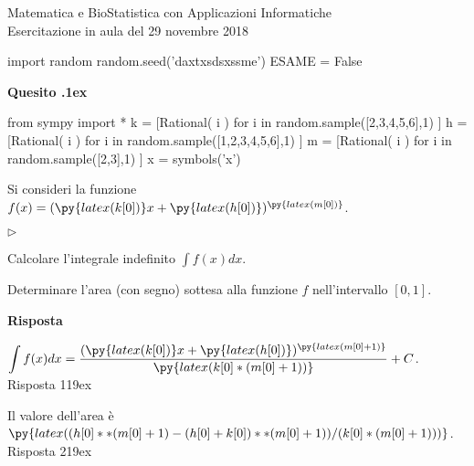 \documentclass[11pt,twoside,a4paper]{article}
\newcommand{\mylabel}[1]{#1\hfill}
\renewenvironment{itemize}
  {\begin{list}{$\triangleright$}{%
   \setlength{\parskip}{0mm}
   \setlength{\topsep}{.4\baselineskip}
   \setlength{\rightmargin}{0mm}
   \setlength{\listparindent}{0mm}
   \setlength{\itemindent}{0mm}
   \setlength{\labelwidth}{2ex}
   \setlength{\itemsep}{.4\baselineskip}
   \setlength{\parsep}{0mm}
   \setlength{\partopsep}{0mm}
   \setlength{\labelsep}{1ex}
   \setlength{\leftmargin}{\labelwidth+\labelsep}
   \let\makelabel\mylabel}}{%
   \end{list}\vspace*{-1.3mm}}
\newcounter{quesito}
\newenvironment{question}{\addtocounter{quesito}{1}\par\textbf{Quesito \thequesito.\kern1ex}}{\vspace{0.5\parskip}}
\newenvironment{answer}{\par\textbf{Risposta\quad}}{\vspace{\parskip}}
\begin{document}
\colorbox{blue!10}{\begin{minipage}{\textwidth}
Matematica e BioStatistica con Applicazioni Informatiche\\
Esercitazione in aula del 29 novembre 2018
\end{minipage}}



\begin{pycode}
import random
random.seed('daxtxsdsxssme')
ESAME = False
\end{pycode}


\begin{question}
\begin{pycode}
from sympy import *
k = [Rational( i ) for i in random.sample([2,3,4,5,6],1) ]
h = [Rational( i ) for i in random.sample([1,2,3,4,5,6],1) ]
m = [Rational( i ) for i in random.sample([2,3],1) ]
x = symbols('x')
\end{pycode}
Si consideri la funzione $f(x) = (\py{latex(k[0])}x+\py{latex(h[0])})^{\py{latex(m[0])}}$.
\begin{itemize}
\item[1.] Calcolare l'integrale indefinito $\displaystyle \int f(x) dx$.
\item[2.] Determinare l'area (con segno) sottesa alla funzione $f$ nell'intervallo $[0,1]$.
\end{itemize}
\begin{answer}

{\color{blue}
$\displaystyle \int f(x) dx = \frac{(\py{latex(k[0])}x+\py{latex(h[0])})^{\py{latex(m[0]+1)}}}{\py{latex(k[0]*(m[0]+1))}} + C$.
\hfill Risposta 1\kern19ex}

\smallskip
{\color{blue} Il valore dell'area è $\py{latex((h[0]**(m[0]+1)-(h[0]+k[0])**(m[0]+1))/(k[0]*(m[0]+1)))}$.
\hfill Risposta 2\kern19ex}

\end{answer}
\end{question}
\end{document}
